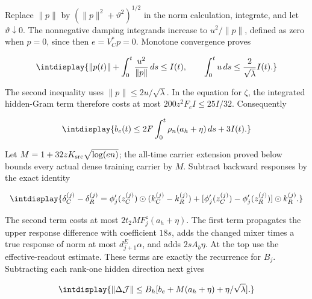 Replace \(\|p\|\) by \((\|p\|^2+\vartheta^2)^{1/2}\) in the norm calculation, integrate, and let \(\vartheta\downarrow0\). The nonnegative damping integrands increase to \(u^2/\|p\|\), defined as zero when \(p=0\), since then \(e=V_C^*p=0\). Monotone convergence proves


\begingroup\renewcommand{\theHequation}{intdisplay.599}
\begin{equation}
\intdisplay{
\|p(t)\|+\int_0^t\frac{u^2}{\|p\|}\,ds\le I(t),\qquad
\int_0^tu\,ds\le\frac2{\sqrt\lambda}I(t).
}
\label{int:eq-0254-harmonic-lifted-error-integrals}
\end{equation}
\endgroup


The second inequality uses \(\|p\|\le2u/\sqrt\lambda\). In the equation for \(\zeta\), the integrated hidden-Gram term therefore costs at most \(200z^2F_cI\le25I/32\). Consequently


\begingroup\renewcommand{\theHequation}{intdisplay.600}
\begin{equation}
\intdisplay{
b_e(t)\le2F\int_0^t\rho_n(a_h+\eta)\,ds+3I(t).
}
\label{int:eq-0255-harmonic-readout-error-integral}
\end{equation}
\endgroup


Let \(M=1+32zK_{\rm src}\sqrt{\log(en)}\); the all-time carrier extension proved below bounds every actual dense training carrier by \(M\). Subtract backward responses by the exact identity


\begingroup\renewcommand{\theHequation}{intdisplay.601}
\begin{equation*}
\intdisplay{
\delta_C^{(j)}-\delta_R^{(j)}
 =\phi_j'(z_C^{(j)})\odot(k_C^{(j)}-k_R^{(j)})
 +[\phi_j'(z_C^{(j)})-\phi_j'(z_R^{(j)})]\odot k_R^{(j)}.
}
\end{equation*}
\endgroup


The second term costs at most \(2t_2MF_j^z(a_h+\eta)\). The first term propagates the upper response difference with coefficient \(18s\), adds the changed mixer times a true response of norm at most \(d_{j+1}^E\alpha\), and adds \(2sA_b\eta\). At the top use the effective-readout estimate. These terms are exactly the recurrence for \(B_j\). Subtracting each rank-one hidden direction next gives


\begingroup\renewcommand{\theHequation}{intdisplay.602}
\begin{equation}
\intdisplay{
\|\Delta\mathcal J\|
 \le B_h[b_e+M(a_h+\eta)+\eta/\sqrt\lambda].
}
\label{int:eq-0256-harmonic-hidden-direction-difference}
\end{equation}
\endgroup

